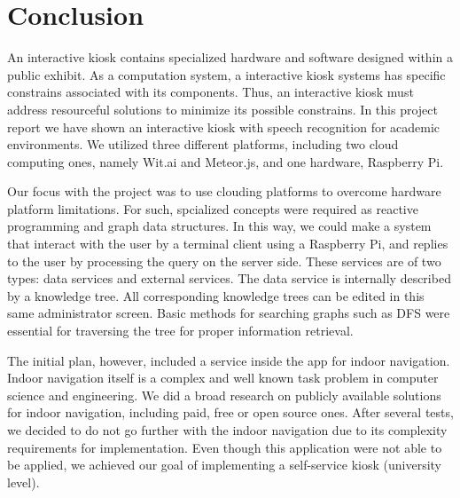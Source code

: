 \chapter{Conclusion}
\label{sec:conclusion}


An interactive kiosk contains specialized hardware and software designed within a public exhibit.
As a computation system, a interactive kiosk systems has specific constrains associated with its components.
Thus, an interactive kiosk must address resourceful solutions to minimize its possible constrains.
In this project report we have shown an interactive kiosk with speech recognition for academic environments.
We utilized three different platforms, including two cloud computing ones, namely Wit.ai and Meteor.js, and one hardware, Raspberry Pi.

Our focus with the project was to use clouding platforms to overcome hardware platform limitations.
For such, spcialized concepts were required as reactive programming and graph data structures.
In this way, we could make a system that interact with the user by a terminal client using a Raspberry Pi, and replies to the user by processing the query on the server side.
These services are of two types: data services and external services.
The data service is internally described by a knowledge tree.
All corresponding knowledge trees can be edited in this same administrator screen.
Basic methods for searching graphs such as DFS were essential for traversing the tree for proper information retrieval.

The initial plan, however, included a service inside the app for indoor navigation.
Indoor navigation itself is a complex and well known task problem in computer science and engineering.
We did a broad research on publicly available solutions for indoor navigation, including paid, free or open source ones.
After several tests, we decided to do not go further with the indoor navigation due to its complexity requirements for implementation.
Even though this application were not able to be applied, we achieved our goal of implementing a self-service kiosk (university level).